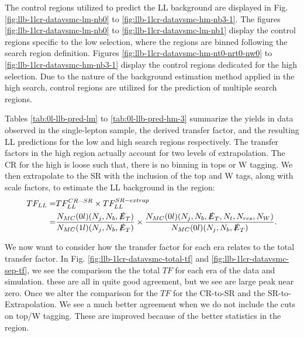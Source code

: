 The control regions utilized to predict the LL background are displayed in Fig. \ref{fig:llb-1lcr-datavsmc-lm-nb0} to \ref{fig:llb-1lcr-datavsmc-hm-nb3-1}. The figures \ref{fig:llb-1lcr-datavsmc-lm-nb0} to \ref{fig:llb-1lcr-datavsmc-lm-nb1} display the control regions specific to the low \dm{} selection, where the regions are binned following the search region definition. Figures \ref{fig:llb-1lcr-datavsmc-hm-nt0-nrt0-nw0} to \ref{fig:llb-1lcr-datavsmc-hm-nb3-1} display the control regions dedicated for the high \dm{} selection. Due to the nature of the background estimation method applied in the high \dm{} search, control regions are utilized for the prediction of multiple search regions. 

Tables \ref{tab:0l-llb-pred-lm} to \ref{tab:0l-llb-pred-hm-3} summarize the yields in data observed in the single-lepton sample, the derived transfer factor, and the resulting LL predictions for the low \dm{} and high \dm{} search regions respectively. The transfer factors in the high \dm{} region actually account for two levels of extrapolation. The CR for the high \dm{} is loose such that, there is no binning in tops or W tagging. We then extrapolate to the SR with the inclusion of the top and W tags, along with scale factors, to estimate the LL background in the region:
\begin{equation}\label{TFExtrapolation}
\begin{split}
TF_{LL}=& TF_{LL}^{CR-SR}\times TF_{LL}^{SR-extrap} \\
=& \frac{N_{MC}(0l)(N_{j},N_{b},\slashed{E}_{T})}{N_{MC}(1l)(N_{j},N_{b},\slashed{E}_{T})}\times\frac{N_{MC}(0l)(N_{j},N_{b},\slashed{E}_{T},N_{t},N_{res},N_{W})}{N_{MC}(0l)(N_{j},N_{b},\slashed{E}_{T})}.
\end{split}
\end{equation}

We now want to consider how the transfer factor for each era relates to the total transfer factor. In Fig. \ref{fig:llb-1lcr-datavsmc-total-tf} and \ref{fig:llb-1lcr-datavsmc-sep-tf}, we see the comparison the the total $TF$ for each era of the data and simulation. these are all in quite good agreement, but we see are large peak near zero. Once we alter the comparison for the $TF$ for the CR-to-SR and the SR-to-Extrapolation. We see a much better agreement when we do not include the cuts on top/W tagging. These are improved because of the better statistics in the region. 






